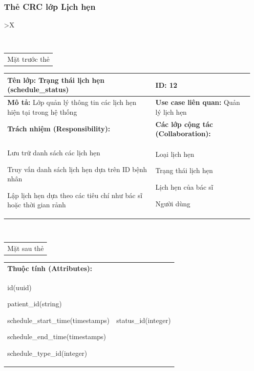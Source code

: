 \subsubsection{Thẻ CRC lớp Lịch hẹn}

\begin{xltabular}{\textwidth}{
		>{\centering\arraybackslash}X
	}
	\caption{\bfseries \fontsize{12pt}{0pt}\selectfont Thẻ CRC lớp Lịch hẹn}
	\\
	\begin{tabularx}{0.9\textwidth}{X}
		Mặt trước thẻ
	\end{tabularx}
	\begin{tabularx}{0.9\textwidth}{|X|X|}
		\hline
		\textbf{Tên lớp:} Trạng thái lịch hẹn (schedule\_status)                   & \textbf{ID:} 12                                \\
		\hline
		\textbf{Mô tả:} Lớp quản lý thông tin các lịch hẹn hiện tại trong hệ thống & \textbf{Use case liên quan:}  Quản lý lịch hẹn \\
		\hline
		\textbf{Trách nhiệm (Responsibility):}                                     & \textbf{Các lớp cộng tác (Collaboration):}     \\
		Lưu trữ danh sách các lịch hẹn

		Truy vấn danh sách lịch hẹn dựa trên ID bệnh nhân

		Lập lịch hẹn dựa theo các tiêu chí như bác sĩ hoặc thời gian rảnh
		                                                                           &
		Loại lịch hẹn

		Trạng thái lịch hẹn

		Lịch hẹn của bác sĩ

		Người dùng
		\\
		\hline
	\end{tabularx}
	\\
	\begin{tabularx}{0.9\textwidth}{X}
		Mặt sau thẻ
	\end{tabularx}
	\begin{tabularx}{0.9\textwidth}{|X|X|}
		\hline
		\textbf{Thuộc tính (Attributes):} & \\
		id(uuid)

		patient\_id(string)

		schedule\_start\_time(timestamps)

		schedule\_end\_time(timestamps)

		schedule\_type\_id(integer)
		                                  &
		status\_id(integer)


\end{tabularx}
\end{xltabular}
